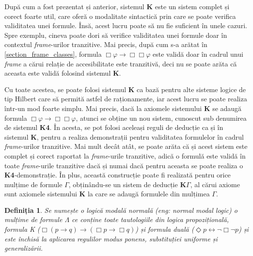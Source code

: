 \documentclass[12pt, openany]{book}
\newtheorem{definition}{Definiția}[chapter] %
\newcommand{\mysectionreference}[1]{\autoref{#1}}
\newcommand{\myenglishterm}[1]{(\textit{eng: #1})}
\begin{document}
            \par{}
                După cum a fost prezentat și anterior, sistemul \textbf{K} este un sistem complet și corect foarte util, care
                oferă o modalitate sintactică prin care se poate verifica validitatea unei formule. Însă, acest lucru poate 
                să nu fie suficient în unele cazuri. Spre exemplu, cineva poate dori să verifice validitatea unei formule 
                doar în contextul \textit{frame}-urilor tranzitive. Mai precis, după cum s-a arătat în 
                \mysectionreference{section_frame_classes}, formula $\Box \varphi \rightarrow \Box \Box \varphi$ este validă
                doar în cadrul unui \textit{frame} a cărui relație de accesibilitate este tranzitivă, deci nu se poate arăta
                că aceasta este validă folosind sistemul \textbf{K}. 
            
            \par{}
                Cu toate acestea, se poate folosi sistemul \textbf{K} ca bază pentru alte sisteme logice de tip Hilbert care 
                să permită astfel de raționamente, iar acest lucru se poate realiza într-un mod foarte simplu. Mai precis, 
                dacă la axiomele sistemului \textbf{K} se adaugă formula $\Box \varphi \rightarrow \Box \Box \varphi$, 
                atunci se obține un nou sistem, cunoscut sub denumirea de sistemul \textbf{K4}. În acesta, se pot folosi 
                aceleași reguli de deducție ca și în sistemul \textbf{K}, pentru a realiza demonstrații pentru validitatea 
                formulelor în cadrul \textit{frame}-urilor tranzitive. Mai mult decât atât, se poate arăta că și acest 
                sistem este complet și corect raportat la \textit{frame}-urile tranzitive, adică o formulă este validă în 
                toate \textit{frame}-urile tranzitive dacă și numai dacă pentru aceasta se poate realiza o 
                \textbf{K4}-demonstrație. În plus, această construcție poate fi realizată pentru orice mulțime de formule 
                $\Gamma$, obținându-se un sistem de deducție \textbf{K}$\Gamma$, al cărui axiome sunt axiomele 
                sistemului \textbf{K} la care se adaugă formulele din mulțimea $\Gamma$.

            \begin{definition}
                Se numește o logică modală normală \myenglishterm{normal modal logic} o mulțime de formule $\Lambda$ ce 
                conține toate tautologiile din logica propozițională, formula K ($\Box (p \rightarrow q) \rightarrow 
                (\Box p \rightarrow \Box q)$) și formula duală ($\Diamond p \leftrightarrow \neg \Box \neg p$) și este 
                închisă la aplicarea regulilor \textit{modus ponens}, substituției uniforme și generalizării.
            \end{definition}
\end{document}
